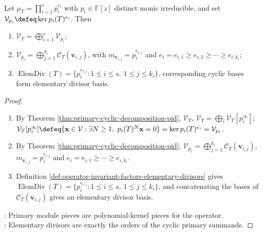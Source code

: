 \begin{theorem} \label{thm:operator-primary-cyclic-decomposition} \\
Let $\mu_T=\prod_{i=1}^sp_i^{e_i}$ with $p_i\in\mathbb{F}[z]$ distinct monic irreducible, and set $\mathcal{V}_{p_i}\defeq\ker p_i(T)^{e_i}$. Then
\begin{enumerate}[label=(\roman*)]
\setlength{\itemsep}{0pt}
\item $\mathcal{V}_T=\bigoplus_{i=1}^s\mathcal{V}_{p_i}$;
\item $\mathcal{V}_{p_i}=\bigoplus_{j=1}^{k_i}\mathcal{C}_T(\mathbf{v}_{i,j})$, with $m_{\mathbf{v}_{i,j}}=p_i^{e_{i,j}}$ and $e_i=e_{i,1}\geq e_{i,2}\geq\cdots\geq e_{i,k_i}$;
\item $\operatorname{ElemDiv}(T)=\{p_i^{e_{i,j}}:1\leq i\leq s,\ 1\leq j\leq k_i\}$, corresponding cyclic bases form elementary divisor basis.
\end{enumerate}
\begin{proof}
\begin{enumerate}[label=(\roman*)]
\setlength{\itemsep}{0pt}
\item By Theorem \ref{thm:primary-cyclic-decomposition-pid}, $\mathcal{V}_T$, $\mathcal{V}_T=\bigoplus_i\mathcal{V}_T[p_i^\infty]$; $\mathcal{V}_T[p_i^\infty]\defeq\{\mathbf{x}\in\mathcal{V}:\exists N\geq1,\ p_i(T)^N\mathbf{x}=0\}=\ker p_i(T)^{e_i}=\mathcal{V}_{p_i}$.
\item By Theorem \ref{thm:primary-cyclic-decomposition-pid}, $\mathcal{V}_{p_i}=\bigoplus_{j=1}^{k_i}\mathcal{C}_T(\mathbf{v}_{i,j})$, $m_{\mathbf{v}_{i,j}}=p_i^{e_{i,j}}$ and $e_i=e_{i,1}\geq\cdots\geq e_{i,k_i}$.
\item Definition \ref{def:operator-invariant-factors-elementary-divisors} gives $\operatorname{ElemDiv}(T)=\{p_i^{e_{i,j}}:1\leq i\leq s,\ 1\leq j\leq k_i\}$, and concatenating the bases of $\mathcal{C}_T(\mathbf{v}_{i,j})$ gives an elementary divisor basis.
\end{enumerate}
: Primary module pieces are polynomial-kernel pieces for the operator.\\
: Elementary divisors are exactly the orders of the cyclic primary summands.
\end{proof}
\end{theorem}

